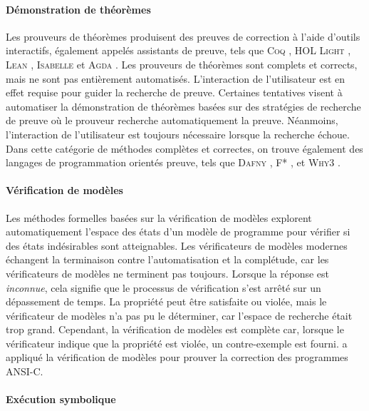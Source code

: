 {\em
\paragraph{Démonstration de théorèmes}

Les prouveurs de théorèmes  produisent des preuves de correction à l'aide d'outils interactifs, également appelés assistants de preuve, tels que \textsc{Coq} , \textsc{HOL Light} , \textsc{Lean} , \textsc{Isabelle}  et \textsc{Agda} . Les prouveurs de théorèmes sont complets et corrects, mais ne sont pas entièrement automatisés. L'interaction de l'utilisateur est en effet requise pour guider la recherche de preuve. Certaines tentatives visent à automatiser la démonstration de théorèmes  basées sur des stratégies de recherche de preuve où le prouveur recherche automatiquement la preuve. Néanmoins, l'interaction de l'utilisateur est toujours nécessaire lorsque la recherche échoue. Dans cette catégorie de méthodes complètes et correctes, on trouve également des langages de programmation orientés preuve, tels que \textsc{Dafny} , \textsc{F*} , et \textsc{Why3} .

\paragraph{Vérification de modèles}

Les méthodes formelles basées sur la vérification de modèles  explorent automatiquement l'espace des états d'un modèle de programme pour vérifier si des états indésirables sont atteignables. Les vérificateurs de modèles modernes échangent la terminaison contre l'automatisation et la complétude, car les vérificateurs de modèles ne terminent pas toujours. Lorsque la réponse est \emph{inconnue}, cela signifie que le processus de vérification s'est arrêté sur un dépassement de temps. La propriété peut être satisfaite ou violée, mais le vérificateur de modèles n'a pas pu le déterminer, car l'espace de recherche était trop grand. Cependant, la vérification de modèles est complète car, lorsque le vérificateur indique que la propriété est violée, un contre-exemple est fourni.  a appliqué la vérification de modèles pour prouver la correction des programmes ANSI-C.

\paragraph{Exécution symbolique}

}
